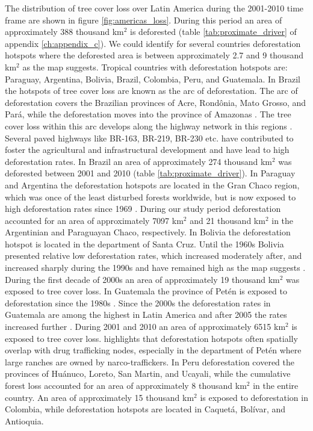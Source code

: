 			The distribution of tree cover loss over Latin America during the 2001-2010 time frame are shown in figure \ref{fig:americas_loss}. During this period an area of approximately 388 thousand km$^2$ is deforested (table \ref{tab:proximate_driver} of appendix \ref{ch:appendix_c}). We could identify for several countries deforestation hotspots where the deforested area is between approximately 2.7 and 9 thousand km$^2$ as the map suggests. Tropical countries with deforestation hotspots are: Paraguay, Argentina, Bolivia, Brazil, Colombia, Peru, and Guatemala. In Brazil the hotspots of tree cover loss are known as the arc of deforestation. The arc of deforestation covers the Brazilian provinces of Acre, Rond\^{o}nia, Mato Grosso, and Pará, while the deforestation moves into the province of Amazonas \citep{Wood2002}. The tree cover loss within this arc develops along the highway network in this regions \citep{Alves2002,Mueller2016}. Several paved highways like BR-163, BR-219, BR-230 etc. have contributed to foster the agricultural and infrastructural development and have lead to high deforestation rates. In Brazil an area of approximately 274 thousand km$^2$ was deforested between 2001 and 2010 (table \ref{tab:proximate_driver}). In Paraguay and Argentina the deforestation hotspots are located in the Gran Chaco region, which was once of the least disturbed forests worldwide, but is now exposed to high deforestation rates since 1969 \citep{Caldas2013,Zak2004}. During our study period deforestation accounted for an area of approximately 7097 km$^2$ and 21 thousand km$^2$ in the Argentinian and Paraguayan Chaco, respectively. In Bolivia the deforestation hotspot is located in the department of Santa Cruz. Until the 1960s Bolivia presented relative low deforestation rates, which increased moderately after, and increased sharply during the 1990s and have remained high as the map suggests \citep{Pacheco2002,DavidKaimowitz2002}. During the first decade of 2000s an area of approximately 19 thousand km$^2$ was exposed to tree cover loss. In Guatemala the province of Petén is exposed to deforestation since the 1980s \citep{Beach1998}. Since the 2000s the deforestation rates in Guatemala are among the highest in Latin America and after 2005 the rates increased further \citep{McSweeney2014}. During 2001 and 2010 an area of approximately 6515 km$^2$ is exposed to tree cover loss. \citet{McSweeney2014} highlights that deforestation hotspots often spatially overlap with drug trafficking nodes, especially in the department of Petén where large ranches are owned by narco-traffickers. In Peru deforestation covered the provinces of Huánuco, Loreto, San Martin, and Ucayali, while the cumulative forest loss accounted for an area of approximately 8 thousand km$^2$ in the entire country. An area of approximately 15 thousand km$^2$ is exposed to deforestation in Colombia, while deforestation hotspots are located in Caquetá, Bolívar, and Antioquia.
